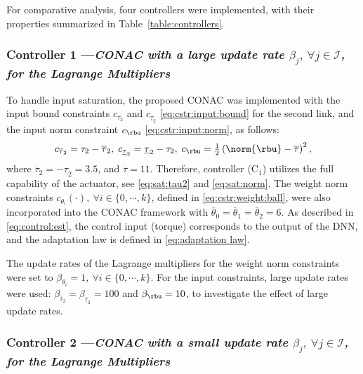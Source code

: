 \documentclass[letterpaper, journal]{IEEEtran}
\begin{document}
For comparative analysis, four controllers were implemented, with their properties summarized in Table~\ref{table:controllers}.

\subsubsection*{Controller 1 —\textit{CONAC with a large update rate $\beta_j,\ \forall j\in\mathcal{I}$, for the Lagrange Multipliers}}

To handle input saturation, the proposed CONAC was implemented with the input bound constraints $c_{\overline\tau_2}$ and $c_{\underline\tau_2}$ \eqref{eq:cstr:input:bound} for the second link, and the input norm constraint $c_{\rbu}$ \eqref{eq:cstr:input:norm}, as follows:
\begin{equation}
    c_{\overline\tau_2}     
    =
    \tau_2-\overline\tau_2
    ,
    \;
    c_{\underline\tau_2} 
    =
    \underline\tau_2-\tau_2
    ,
    \;
    c_{\rbu}
    =
    \tfrac{1}{2}
    \left(
        \norm{\rbu}-\overline\tau
    \right)^2 
    ,
    \label{eq:sim:cstr:CONAC}
\end{equation}
where $\overline\tau_2=-\underline{\tau}_2=3.5$, and $\overline\tau=11$.
Therefore, controller (C$_1$) utilizes the full capability of the actuator, see \eqref{eq:sat:tau2} and \eqref{eq:sat:norm}.
The weight norm constraints $c_{\theta_i}(\cdot),\ \forall i\in\{0,\cdots,k\}$, defined in \eqref{eq:cstr:weight:ball}, were also incorporated into the CONAC framework with $\overline\theta_0=\overline\theta_1=\overline\theta_2=6$.
As described in \eqref{eq:control:est}, the control input (torque) corresponds to the output of the DNN, and the adaptation law is defined in \eqref{eq:adaptation law}.

The update rates of the Lagrange multipliers for the weight norm constraints were set to $\beta_{\theta_i}=1,\ \forall i\in\{0,\cdots,k\}$.
For the input constraints, large update rates were used: $\beta_{\overline{\tau}_2} = \beta_{\underline{\tau}_2} = 100$ and $\beta_{\rbu} = 10$, to investigate the effect of large update rates.

\subsubsection*{Controller 2 —\textit{CONAC with a small update rate $\beta_j,\ \forall j\in\mathcal{I}$, for the Lagrange Multipliers}}
\end{document}
